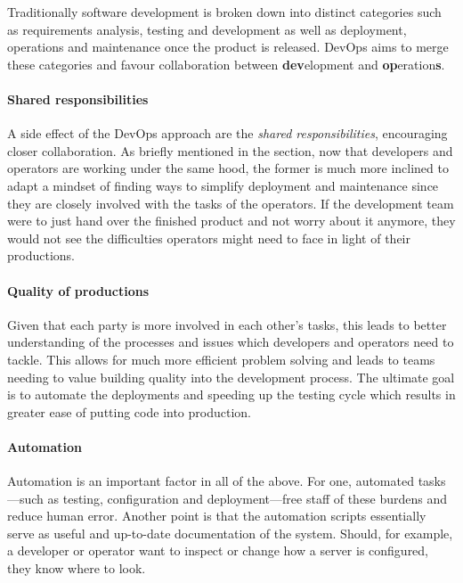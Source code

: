 Traditionally software development is broken down into distinct
categories such as requirements analysis, testing and development as
well as deployment, operations and maintenance once the product is
released. DevOps aims to merge these categories and favour
collaboration between \textbf{dev}elopment and
\textbf{op}eration\textbf{s}. \cite{devops-culture}

\paragraph{Shared responsibilities}

A side effect of the DevOps approach are the \textit{shared
responsibilities}, encouraging closer collaboration. As briefly
mentioned in the  section, now that
developers and operators are working under the same hood, the former
is much more inclined to adapt a mindset of finding ways to simplify
deployment and maintenance since they are closely involved with the
tasks of the operators. If the development team were to just hand over
the finished product and not worry about it anymore, they would not
see the difficulties operators might need to face in light of their
productions. \cite{devops-culture}

\paragraph{Quality of productions}

Given that each party is more involved in each other's tasks, this
leads to better understanding of the processes and issues which
developers and operators need to tackle. This allows for much more
efficient problem solving and leads to teams needing to value building
quality into the development process. The ultimate goal is to automate the
deployments and speeding up the testing cycle which results in greater
ease of putting code into production. \cite{devops-culture}

\paragraph{Automation}

Automation is an important factor in all of the above. For one,
automated tasks---such as testing, configuration and deployment---free
staff of these burdens and reduce human error. Another point is that
the automation scripts essentially serve as useful and up-to-date
documentation of the system. Should, for example, a developer or
operator want to inspect or change how a server is configured, they
know where to look. \cite{devops-culture}

